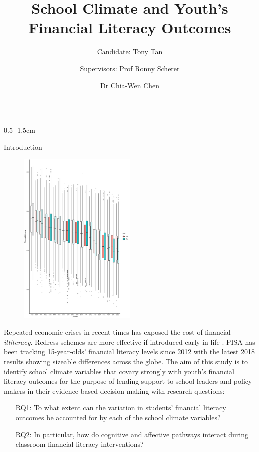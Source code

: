 \documentclass{uioposter}
\title{School Climate and Youth's Financial Literacy Outcomes}
\author
{%
    Candidate: Tony Tan%
    \and
    Supervisors: Prof Ronny Scherer%
    \and
    Dr Chia-Wen Chen%
}
\institute{Centre for Educational Measurement, Faculty of Educational Sciences, University of Oslo}
\begin{document}
\begin{frame}

\begin{columns}[onlytextwidth]

\begin{column}{0.5\textwidth - 1.5cm}

    \begin{block}{Introduction}
        \begin{figure}
            \centering
            \includegraphics[width=0.5\textwidth]{../Figures/distribution.pdf}
        \end{figure}
        Repeated economic crises in recent times has exposed the cost of financial \emph{illiteracy}. Redress schemes are more effective if introduced early in life \parencite{lusardi:2014}. PISA has been tracking 15-year-olds' financial literacy levels since 2012 with the latest 2018 results showing sizeable differences across the globe. The aim of this study is to identify school climate variables that covary strongly with youth's financial literacy outcomes for the purpose of lending support to school leaders and policy makers in their evidence-based decision making with research questions:

        \begin{enumerate}
            \item[RQ1:] To what extent can the variation in students' financial literacy outcomes be accounted for by each of the school climate variables?
            \item[RQ2:] In particular, how do cognitive and affective pathways interact during classroom financial literacy interventions?
        \end{enumerate}
    \end{block}


\end{column}
\end{columns}
\end{frame}
\end{document}
